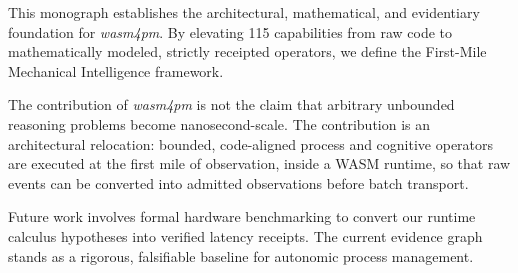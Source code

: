 This monograph establishes the architectural, mathematical, and evidentiary foundation for \textit{wasm4pm}. By elevating 115 capabilities from raw code to mathematically modeled, strictly receipted operators, we define the First-Mile Mechanical Intelligence framework.

The contribution of \textit{wasm4pm} is not the claim that arbitrary unbounded reasoning problems become nanosecond-scale. The contribution is an architectural relocation: bounded, code-aligned process and cognitive operators are executed at the first mile of observation, inside a WASM runtime, so that raw events can be converted into admitted observations before batch transport.

Future work involves formal hardware benchmarking to convert our runtime calculus hypotheses into verified latency receipts. The current evidence graph stands as a rigorous, falsifiable baseline for autonomic process management.

